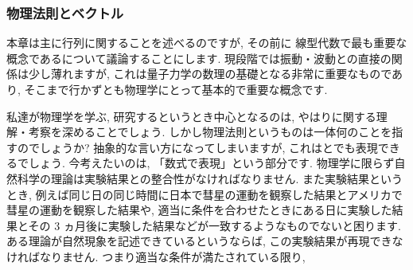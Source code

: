 \documentclass[openany, a4paper, oneside]{jsbook}
\begin{document}
\subsubsection{物理法則とベクトル}

本章は主に行列に関することを述べるのですが, その前に
線型代数で最も重要な概念であるについて議論することにします.
現段階では振動・波動との直接の関係は少し薄れますが,
これは量子力学の数理の基礎となる非常に重要なものであり,
そこまで行かずとも物理学にとって基本的で重要な概念です.

私達が物理学を学ぶ, 研究するというとき中心となるのは,
やはりに関する理解・考察を深めることでしょう.
しかし物理法則というものは一体何のことを指すのでしょうか?
抽象的な言い方になってしまいますが,
これはとでも表現できるでしょう.
今考えたいのは, 「数式で表現」という部分です.
物理学に限らず自然科学の理論は実験結果との整合性がなければなりません.
また実験結果というとき, 例えば同じ日の同じ時間に日本で彗星の運動を観察した結果とアメリカで彗星の運動を観察した結果や,
適当に条件を合わせたときにある日に実験した結果とその 3 ヵ月後に実験した結果などが一致するようなものでないと困ります.
ある理論が自然現象を記述できているというならば, この実験結果が再現できなければなりません.
つまり適当な条件が満たされている限り,
\end{document}
